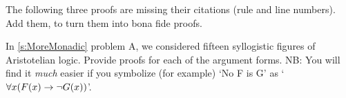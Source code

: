 \problempart 
\label{pr.justifyFOLproof}
The following three proofs are missing their citations (rule and line numbers). Add them, to turn them into bona fide proofs.
\begin{compactlist}
\item \begin{fitchproof}
\PR
{}\PR
{}
	\open
		\AS
	\close
{} {}
\end{fitchproof}

\item \begin{fitchproof}
\PR
{}\PR
{}
 {}
 {}
\end{fitchproof}

\item \begin{fitchproof}
\PR
{}\PR
{}\PR
\open
	\AS
\close
{}
\end{fitchproof}
\end{compactlist}

\problempart
\label{pr.BarbaraEtc.proof1}
In \cref{s:MoreMonadic} problem A, we considered fifteen syllogistic figures of Aristotelian logic. Provide proofs for each of the argument forms. NB: You will find it \emph{much} easier if you symbolize (for example) `No F is G' as `$\forall x (F(x) \rightarrow \neg G(x))$'.

\

